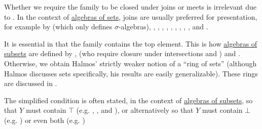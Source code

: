 \begin{comments}
  \item Whether we require the family to be closed under joins or meets is irrelevant due to . In the context of \hyperref[def:algebra_of_subsets]{algebras of sets}, joins are usually preferred for presentation, for example by
   (which only defines \( \sigma \)-algebras),
  ,
  ,
  ,
  ,
  ,
  ,
  ,
  ,
  ,
   and
  .

  \item It is essential in  that the family contains the top element. This is how \hyperref[def:algebra_of_subsets]{algebras of subsets} are defined by
  ,
   (who require closure under intersections and ) and
  .
  Otherwise, we obtain Halmos' strictly weaker notion of a \enquote{ring of sets} (although Halmos discusses sets specifically, his results are easily generalizable). These rings are discussed in .

  \item The simplified condition  is often stated, in the context of \hyperref[def:algebra_of_subsets]{algebras of subsets}, so that \( Y \) must contain \( \top \) (e.g. , ,  and ), or alternatively so that \( Y \) must contain \( \bot \) (e.g. ) or even both (e.g. )
\end{comments}
